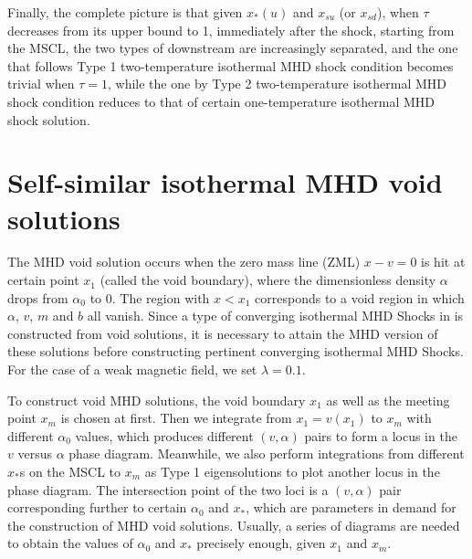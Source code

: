 \documentclass[fleqn,usenatbib]{mnras}
\begin{document}
Finally, the complete picture is that given $x_{*}(u)$ and $x_{su}$ (or $x_{sd}$), when $\tau$ decreases from its upper bound to 1, immediately after the shock, starting from the MSCL, the two types of downstream are increasingly separated, and the one that follows Type 1 two-temperature isothermal MHD shock condition becomes trivial when $\tau=1$, while the one by Type 2 two-temperature isothermal MHD shock condition reduces to that of certain one-temperature isothermal MHD shock solution.


\section{Self-similar isothermal MHD void solutions}
\label{s4}
The MHD void solution occurs when the zero mass line (ZML) $x-v=0$ is hit at certain point $x_{1}$ (called the void boundary), where the dimensionless density $\alpha$ drops from $\alpha_{0}$ to 0. The region with $x<x_{1}$ corresponds to a void region in which $\alpha$, $v$, $m$ and $b$ all vanish. Since a type of converging isothermal MHD Shocks in \citet{lou2014self} is constructed from void solutions, it is necessary to attain the MHD version of these solutions before constructing pertinent converging isothermal MHD Shocks. For the case of a weak magnetic field, we set $\lambda=0.1$.

To construct void MHD solutions, the void boundary $x_{1}$ as well as the meeting point $x_{m}$ is chosen at first. Then we integrate from $x_{1}=v(x_{1})$ to $x_{m}$ with different $\alpha_{0}$ values, which produces different $(v,\alpha)$ pairs to form a locus in the $v$ versus $\alpha$ phase diagram. Meanwhile, we also perform integrations from different $x_{*}$s on the MSCL to $x_{m}$ as Type 1 eigensolutions to plot another locus in the phase diagram. The intersection point of the two loci is a $(v,\alpha)$ pair corresponding further to certain $\alpha_{0}$ and $x_{*}$, which are parameters in demand for the construction of MHD void solutions. Usually, a series of diagrams are needed to obtain the values of $\alpha_{0}$ and $x_{*}$ precisely enough, given $x_{1}$ and $x_{m}$. 
\end{document}
